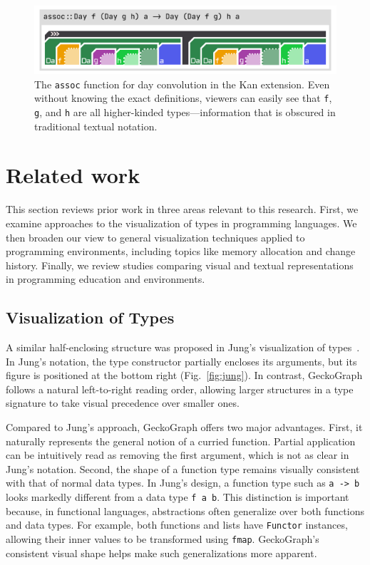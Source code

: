 \documentclass[preprint,12pt]{elsarticle}
\begin{document}
\begin{figure}[]
  \includegraphics[width=\linewidth]{figures/assoc}
  \caption{\label{fig:assoc} 
  The \texttt{assoc} function for day convolution \cite{Day1970-kb} in the Kan extension. 
  Even without knowing the exact definitions, viewers can easily see that \texttt{f}, \texttt{g}, and \texttt{h} are all higher-kinded types—information that is obscured in traditional textual notation.}
\end{figure}


\section{Related work}
This section reviews prior work in three areas relevant to this research. First, we examine approaches to the visualization of types in programming languages. 
We then broaden our view to general visualization techniques applied to programming environments, including topics like memory allocation and change history. Finally, we review studies comparing visual and textual representations in programming education and environments.

\subsection{Visualization of Types}
A similar half-enclosing structure was proposed in Jung’s visualization of types~\cite{Jung2000-oc}. In Jung’s notation, the type constructor partially encloses its arguments, but its figure is positioned at the bottom right (Fig.~\ref{fig:jung}). In contrast, GeckoGraph follows a natural left-to-right reading order, allowing larger structures in a type signature to take visual precedence over smaller ones. 

Compared to Jung’s approach, GeckoGraph offers two major advantages. 
First, it naturally represents the general notion of a curried function. Partial application can be intuitively read as removing the first argument, which is not as clear in Jung’s notation. 
Second, the shape of a function type remains visually consistent with that of normal data types. In Jung’s design, a function type such as \texttt{a -> b} looks markedly different from a data type \texttt{f a b}. 
This distinction is important because, in functional languages, abstractions often generalize over both functions and data types. 
For example, both functions and lists have \texttt{Functor} instances, allowing their inner values to be transformed using \texttt{fmap}. 
GeckoGraph’s consistent visual shape helps make such generalizations more apparent.
\end{document}
